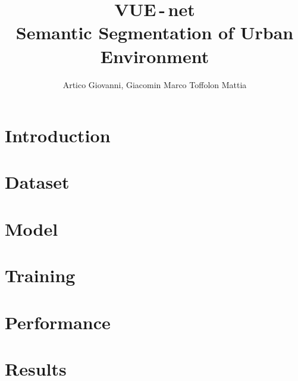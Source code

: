 \documentclass[letterpaper]{article} %
\title{{\myfont VUE\,-\,net}\\{\large Semantic Segmentation of Urban Environment}}
\author{
    Artico Giovanni\equalcontrib,
    Giacomin Marco\equalcontrib
    Toffolon Mattia\equalcontrib
}
\begin{document}
\maketitle

% 
% 
% 

\section{Introduction}


\section{Dataset}


\section{Model}


\section{Training}


\section{Performance}


\section{Results}


\nocite{*}
\newpage

\end{document}
